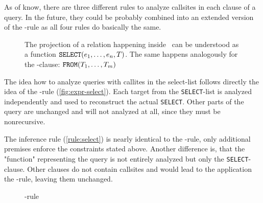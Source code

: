 As of know, there are three different rules to analyze callsites in each clause of a query. In the future, they could be probably combined into an extended version of the \REXPR-rule as all four rules do basically the same.

\begin{figure}[h!]
    \centering
    
    \caption{The projection of a relation happening inside \SELECT~can be understood as a function $\text{\texttt{SELECT}}(e_1, \dots, e_n, T)$. The same happens analogously for the \FROM-clause: $\text{\texttt{FROM}}(T_1, \dots, T_m)$}
    \label{fig:expr-select}
\end{figure}

The idea how to analyze queries with callites in the select-list follows directly the idea of the \REXPR-rule (\autoref{fig:expr-select}). Each target from the \texttt{SELECT}-list is analyzed independently and used to reconstruct the actual \texttt{SELECT}. Other parts of the query are unchanged and will not analyzed at all, since they must be nonrecursive.

The inference rule (\autoref{rule:select}) is nearly identical to the \REXPR-rule, only additional premises enforce the constraints stated above. Another difference is, that the "function" representing the query is not entirely analyzed but only the \texttt{SELECT}-clause. Other clauses do not contain callsites and would lead to the application the \RBASE-rule, leaving them unchanged.

\begin{figure}[h!]
    \centering\footnotesize
    \caption{\RSELECT-rule}
    \label{rule:select}
\end{figure}




